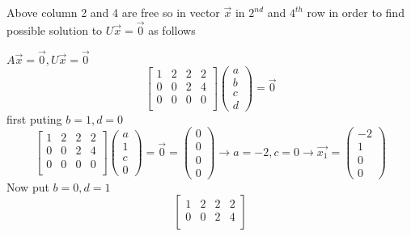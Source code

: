 \documentclass[a4paper,11pt]{article}
\numberwithin{equation}{section}
\begin{document}
\begin{itemize}
    Above column 2 and 4 are free so in vector $\vec{x}$ in $2^{nd}$ and $4^{th}$ row in order to find possible solution to $U\vec{x}=\vec{0}$ as follows
    \begin{center} 
        $A\vec{x}=\vec{0},U\vec{x}=\vec{0}$\\
        \[
            \begin{bmatrix}
                1&2&2&2\\
                0&0&2&4\\
                0&0&0&0\\
            \end{bmatrix}
            \begin{pmatrix}
                a\\
                b\\
                c\\
                d
            \end{pmatrix}=\vec{0}
        \]
        first puting $b=1,d=0$
        \[
            \begin{bmatrix}
                1&2&2&2\\
                0&0&2&4\\
                0&0&0&0\\
            \end{bmatrix}
            \begin{pmatrix}
                a\\
                1\\
                c\\
                0
            \end{pmatrix}=\vec{0}=
            \begin{pmatrix}
                0\\0\\0\\0
            \end{pmatrix}
             \longrightarrow
            a=-2 ,c=0
            \longrightarrow
            \vec{x_1}=
            \begin{pmatrix}
                -2\\1\\0\\0
            \end{pmatrix}
        \]
        Now put $b=0,d=1$
        \[
            \begin{bmatrix}
                1&2&2&2\\
                0&0&2&4\\

\end{bmatrix}\]
\end{center}
\end{itemize}
\end{document}
